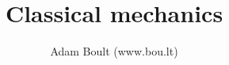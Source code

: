 \documentclass[oneside]{book}
\begin{document}
\author{Adam Boult (www.bou.lt)}
\title{Classical mechanics}
\maketitle

\setcounter{tocdepth}{0}
\tableofcontents


\end{document}
